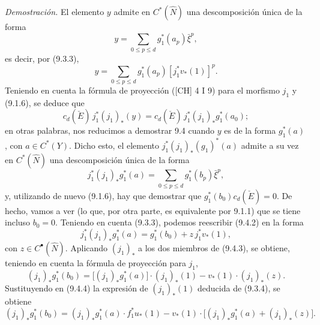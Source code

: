 \emph{Demostración.} El elemento $y$ admite en $C^*(\widehat N)$ una descomposición única de la forma
\[
y=\sum_{0\le p\le d}g_1^*(a_p)\bar\xi^p,
\]
es decir, por (9.3.3),
\[
y=\sum_{0\le p\le d}g_1^*(a_p)[j_1^*v_*(1)]^p.
\tag{9.4.1}
\]
Teniendo en cuenta la fórmula de proyección ([CH] 4 I 9) para el morfismo $j_1$ y (9.1.6), se deduce que
\[
c_d(\check E)\,j_1^*(j_1)_*(y)=c_d(\check E)\,j_1^*(j_1)_*g_1^*(a_0);
\]
en otras palabras, nos reducimos a demostrar 9.4 cuando $y$ es de la forma $g_1^*(a)$, con $a\in C^*(Y)$. Dicho esto, el elemento $j_1^*(j_1)_*(g_1)^*(a)$ admite a su vez en $C^*(\widehat N)$ una descomposición única de la forma
\[
j_1^*(j_1)_*g_1^*(a)=\sum_{0\le p\le d}g_1^*(b_p)\bar\xi^p,
\tag{9.4.2}
\]
y, utilizando de nuevo (9.1.6), hay que demostrar que $g_1^*(b_0)c_d(\check E)=0$. De hecho, vamos a ver (lo que, por otra parte, es equivalente por 9.1.1) que se tiene incluso $b_0=0$. Teniendo en cuenta (9.3.3), podemos reescribir (9.4.2) en la forma
\[
j_1^*(j_1)_*g_1^*(a)=g_1^*(b_0)+z\,j_1^*v_*(1),
\tag{9.4.3}
\]
con $z\in C^{\bullet}(\widehat N)$. Aplicando $(j_1)_*$ a los dos miembros de (9.4.3), se obtiene, teniendo en cuenta la fórmula de proyección para $j_1$,
\[
(j_1)_*g_1^*(b_0)=\bigl[(j_1)_*g_1^*(a)\bigr]\cdot(j_1)_*(1)-v_*(1)\cdot(j_1)_*(z).
\tag{9.4.4}
\]
Sustituyendo en (9.4.4) la expresión de $(j_1)_*(1)$ deducida de (9.3.4), se obtiene
\[
(j_1)_*g_1^*(b_0)=
(j_1)_*g_1^*(a)\cdot f_1^*u_*(1)-v_*(1)\cdot\bigl[(j_1)_*g_1^*(a)+(j_1)_*(z)\bigr].
\tag{9.4.5}
\]
